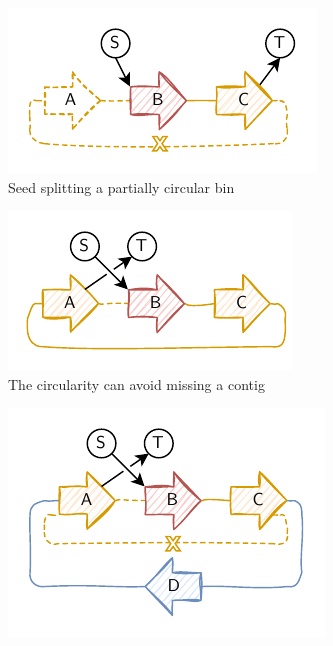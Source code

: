 \begin{figure}
  \centering
  \begin{subfigure}{0.45\linewidth}
    \centering
    \includegraphics[width=\linewidth]{pbf_iterbin/img/pbf_iterbin-middle_seed_splits_partially_circular_plasmid.pdf}
    \caption{Seed splitting a partially circular bin}\label{subfig:pbf_iterbin:middle_seed_splits_partially_circular_plasmid}
  \end{subfigure}
  \hfill
  \begin{subfigure}{0.45\linewidth}
    \centering
    \includegraphics[width=\linewidth]{pbf_iterbin/img/pbf_iterbin-true_circularity_seed_robust.pdf}
    \caption{The circularity can avoid missing a contig}\label{subfig:pbf_iterbin:true_circularity_seed_robust}
  \end{subfigure}
  \hfill
  \begin{subfigure}{\linewidth}
    \centering
    \includegraphics[width=0.45\linewidth]{pbf_iterbin/img/pbf_iterbin-circularity_artefact.pdf}

\end{subfigure}
\end{figure}
